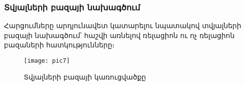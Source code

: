 {
    \subsubsection{Տվյալների բազայի նախագծում}\label{subsubsec:database}

    Հարցումները արդյունավետ կատարելու նպատակով տվյալների բազայի նախագծում՝ հաշվի առնելով ռելացիոն ու ոչ ռելացիոն
    բազաների հատկությունները։

    \begin{figure}[h]
        \centering
        \texttt{[image: pic7]}
        \caption{Տվյալների բազայի կառուցվածքը}
        \label{fig:figure7}
    \end{figure}
}